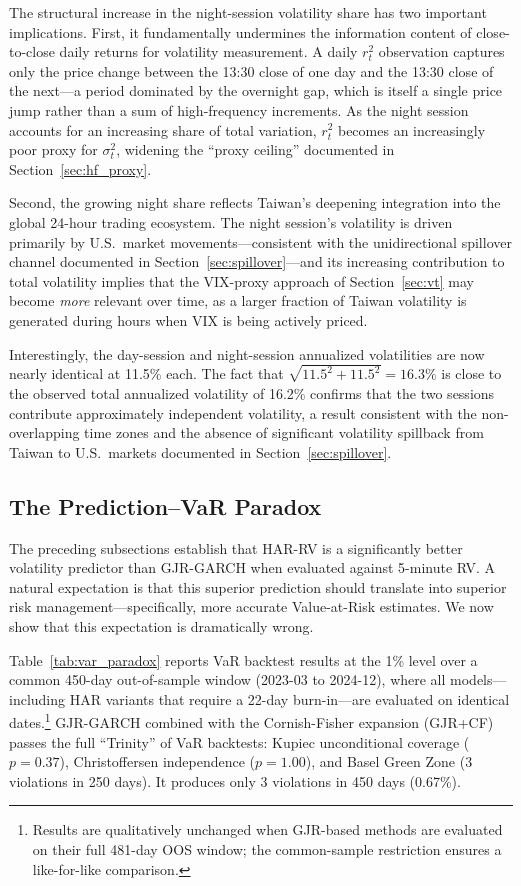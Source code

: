 The structural increase in the night-session volatility share has two important implications. First, it fundamentally undermines the information content of close-to-close daily returns for volatility measurement. A daily $r_t^2$ observation captures only the price change between the 13:30 close of one day and the 13:30 close of the next---a period dominated by the overnight gap, which is itself a single price jump rather than a sum of high-frequency increments. As the night session accounts for an increasing share of total variation, $r_t^2$ becomes an increasingly poor proxy for $\sigma_t^2$, widening the ``proxy ceiling'' documented in Section~\ref{sec:hf_proxy}.

Second, the growing night share reflects Taiwan's deepening integration into the global 24-hour trading ecosystem. The night session's volatility is driven primarily by U.S.\ market movements---consistent with the unidirectional spillover channel documented in Section~\ref{sec:spillover}---and its increasing contribution to total volatility implies that the VIX-proxy approach of Section~\ref{sec:vt} may become \textit{more} relevant over time, as a larger fraction of Taiwan volatility is generated during hours when VIX is being actively priced.

Interestingly, the day-session and night-session annualized volatilities are now nearly identical at 11.5\% each. The fact that $\sqrt{11.5^2 + 11.5^2} = 16.3\%$ is close to the observed total annualized volatility of 16.2\% confirms that the two sessions contribute approximately independent volatility, a result consistent with the non-overlapping time zones and the absence of significant volatility spillback from Taiwan to U.S.\ markets documented in Section~\ref{sec:spillover}.


\subsection{The Prediction--VaR Paradox}
\label{sec:hf_paradox}

The preceding subsections establish that HAR-RV is a significantly better volatility predictor than GJR-GARCH when evaluated against 5-minute RV. A natural expectation is that this superior prediction should translate into superior risk management---specifically, more accurate Value-at-Risk estimates. We now show that this expectation is dramatically wrong.

Table~\ref{tab:var_paradox} reports VaR backtest results at the 1\% level over a common 450-day out-of-sample window (2023-03 to 2024-12), where all models---including HAR variants that require a 22-day burn-in---are evaluated on identical dates.\footnote{Results are qualitatively unchanged when GJR-based methods are evaluated on their full 481-day OOS window; the common-sample restriction ensures a like-for-like comparison.} GJR-GARCH combined with the Cornish-Fisher expansion (GJR+CF) passes the full ``Trinity'' of VaR backtests: Kupiec unconditional coverage ($p = 0.37$), Christoffersen independence ($p = 1.00$), and Basel Green Zone (3 violations in 250 days). It produces only 3 violations in 450 days (0.67\%).

